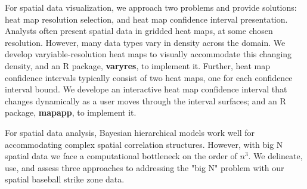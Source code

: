 \indent For spatial data visualization, we approach two problems and provide solutions: heat map resolution selection, and heat map confidence interval presentation. Analysts often present spatial data in gridded heat maps, at some chosen resolution. However, many data types vary in density across the domain. We develop varyiable-resolution heat maps to visually accommodate this changing density, and an R package, {\bf varyres}, to implement it. Further, heat map confidence intervals typically consist of two heat maps, one for each confidence interval bound. We develope an interactive heat map confidence interval that changes dynamically as a user moves through the interval surfaces; and an R package, {\bf mapapp}, to implement it.

For spatial data analysis, Bayesian hierarchical models work well for accommodating complex spatial correlation structures. However, with big N spatial data we face a computational bottleneck on the order of $n^{3}$. We delineate, use, and assess three approaches to addressing the "big N" problem with our spatial baseball strike zone data.




